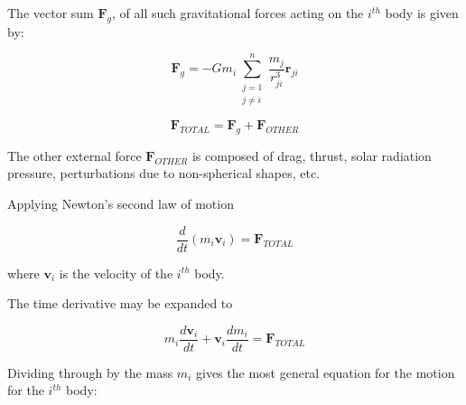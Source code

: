 \documentclass[11pt]{article}
\begin{document}
    The vector sum $\mathbf{F}_{g}$, of all such gravitational forces acting on the ${i}^{th}$ body is given by:

    \begin{equation}
        \mathbf{F}_{g} = -G m_{i}\sum_{\substack{j=1 \\ j \neq i}}^{n} \frac{m_{j}}{r_{ji}^{3}} \mathbf{r}_{ji}
        \label{eq:vector_sum_gravitational_forces}
    \end{equation}


    \begin{equation}
        \mathbf{F}_{TOTAL} = \mathbf{F}_{g} + \mathbf{F}_{OTHER}
        \label{eq:total_force}
    \end{equation}

    \vspace{10mm} %

    The other external force $\mathbf{F}_{OTHER}$ is composed of drag, thrust, solar radiation pressure,
    perturbations due to non-spherical shapes, etc.

    \vspace{10mm} %

    Applying Newton's second law of motion

    \begin{equation}
        \frac{d}{dt} ({m}_{i} \mathbf{v}_{i}) = \mathbf{F}_{TOTAL}
        \label{eq:total_force_newtons_second_law}
    \end{equation}

    \vspace{10mm} %

    where $\mathbf{v}_{i}$ is the velocity of the ${i}^{th}$ body.

    \vspace{10mm} %

    The time derivative may be expanded to

    \begin{equation}
        {m}_{i} \frac{d\mathbf{v}_{i}}{dt} + \mathbf{v}_{i} \frac{d{m}_{i}}{dt} = \mathbf{F}_{TOTAL}
        \label{eq:time_derivative_expansion}
    \end{equation}

    \vspace{10mm} %

    Dividing through by the mass ${m}_{i}$ gives the most general equation for the motion for the ${i}^{th}$ body:
\end{document}
